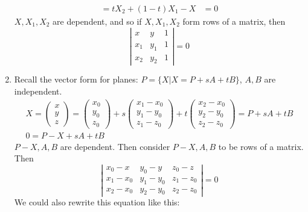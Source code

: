 \documentclass[twoside]{amsart}
\theoremstyle{plain}
\theoremstyle{definition}
\begin{document}
\begin{enumerate}
\[\begin{aligned}
  = tX_2 + (1-t)X_1 - X & = 0 
\end{aligned}
\]
$X,X_1,X_2$ are dependent, and so if $X,X_1,X_2$ form rows of a matrix, then 
\[
\left| \begin{matrix} x & y & 1 \\ x_1 & y_1 & 1 \\ x_2 & y_2 & 1 \end{matrix} \right| = 0 
\]
\item Recall the vector form for planes: $P = \{ X | X = P + sA + tB \}$, $A,B$ are independent.  
\[
\begin{gathered}
X = \left( \begin{matrix} x \\ y \\ z \end{matrix} \right) = \left( \begin{matrix} x_0 \\ y_0 \\ z_0 \end{matrix} \right) + s \left( \begin{matrix} x_1 - x_0 \\ y_1 - y_0 \\ z_1 - z_0 \end{matrix} \right) + t \left( \begin{matrix} x_2 - x_0 \\ y_2 - y_0 \\ z_2 - z_0 \end{matrix} \right) = P + sA + tB \\
0 = P-X + sA + tB
\end{gathered}
\] 
$P-X, A,B$ are dependent.  Then consider $P-X,A,B$ to be rows of a matrix.  Then 
\[
\left| \begin{matrix} x_0 - x & y_0 - y & z_0 - z \\ x_1 - x_0 & y_1 - y_0 & z_1 - z_0 \\ x_2 - x_0 & y_2 - y_0 & z_2 - z_0 \end{matrix} \right| = 0 
\]
We could also rewrite this equation like this:
\[
\begin{gathered}

\end{gathered}\]
\end{enumerate}
\end{document}
